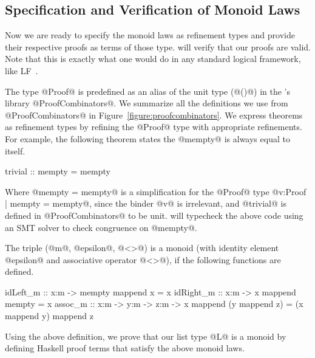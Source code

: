 \subsection{Specification and Verification of Monoid Laws}

Now we are ready to specify the monoid laws as refinement types and
provide their respective proofs as terms of those type. \toolname
will verify that our proofs are valid. 
%
Note that this is exactly what
one would do in any standard logical framework,
like LF~\cite{Harper93}.

The type @Proof@ is predefined as an alias of the unit type (@()@)
in the \toolname's library @ProofCombinators@.
We summarize all the definitions we use from @ProofCombinators@ in 
Figure~\ref{figure:proofcombinators}.
%
We express theorems as refinement types by refining
the @Proof@ type with appropriate refinements.
%
For example, the following theorem states
the @mempty@ is always equal to itself.
\begin{code}
  trivial :: {mempty = mempty}
\end{code}
%
Where @{mempty = mempty}@ is a simplification for the @Proof@ type
@{v:Proof | mempty = mempty}@, since the binder @v@ is irrelevant, and
@trivial@ is defined in @ProofCombinators@ to be unit.
%
\toolname will typecheck the above code using an SMT
solver to check congruence on @mempty@.
%

\begin{definition}[Monoid] \label{definition:monoid}
The triple (@m@, @epsilon@, @<>@) is a monoid
(with identity element @epsilon@ and associative operator @<>@),
if the following functions are defined. %
%
\begin{code}
  idLeft_m  :: x:m -> {mempty mappend x = x}
  idRight_m :: x:m -> {x mappend mempty = x}
  assoc_m   :: x:m -> y:m -> z:m -> {x mappend (y mappend z) = (x mappend y) mappend z}
\end{code}
\end{definition}
%
Using the above definition, we prove that our list type @L@ is a monoid
by defining Haskell proof terms that satisfy the above monoid laws. 


